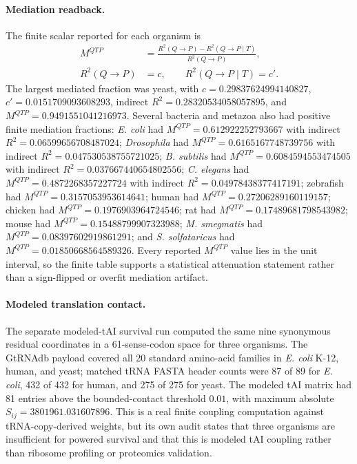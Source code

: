 \paragraph{Mediation readback.}
The finite scalar reported for each organism is
$$
\begin{aligned}
M^{QTP} &= \frac{R^2(Q\to P)-R^2(Q\to P\mid T)}{R^2(Q\to P)},\\
R^2(Q\to P)&=c,\qquad R^2(Q\to P\mid T)=c'.
\end{aligned}
$$
The largest mediated fraction was yeast, with $c=0.29837624994140827$, $c'=0.0151709093608293$, indirect $R^2=0.28320534058057895$, and $M^{QTP}=0.9491551041216973$.  Several bacteria and metazoa also had positive finite mediation fractions: \emph{E. coli} had $M^{QTP}=0.612922252793667$ with indirect $R^2=0.06599656708487024$; \emph{Drosophila} had $M^{QTP}=0.6165167748739756$ with indirect $R^2=0.047530538755721025$; \emph{B. subtilis} had $M^{QTP}=0.6084594553474505$ with indirect $R^2=0.037667440654802556$; \emph{C. elegans} had $M^{QTP}=0.4872268357227724$ with indirect $R^2=0.04978438377417191$; zebrafish had $M^{QTP}=0.3157053953614641$; human had $M^{QTP}=0.27206289160119157$; chicken had $M^{QTP}=0.1976903964724546$; rat had $M^{QTP}=0.17489681798543982$; mouse had $M^{QTP}=0.15488799907323988$; \emph{M. smegmatis} had $M^{QTP}=0.08397602919861291$; and \emph{S. solfataricus} had $M^{QTP}=0.01850668564589326$.  Every reported $M^{QTP}$ value lies in the unit interval, so the finite table supports a statistical attenuation statement rather than a sign-flipped or overfit mediation artifact.

\paragraph{Modeled translation contact.}
The separate modeled-tAI survival run computed the same nine synonymous residual coordinates in a 61-sense-codon space for three organisms.  The GtRNAdb payload covered all 20 standard amino-acid families in \emph{E. coli} K-12, human, and yeast; matched tRNA FASTA header counts were 87 of 89 for \emph{E. coli}, 432 of 432 for human, and 275 of 275 for yeast.  The modeled tAI matrix had 81 entries above the bounded-contact threshold $0.01$, with maximum absolute $S_{ij}=3801961.031607896$.  This is a real finite coupling computation against tRNA-copy-derived weights, but its own audit states that three organisms are insufficient for powered survival and that this is modeled tAI coupling rather than ribosome profiling or proteomics validation.

